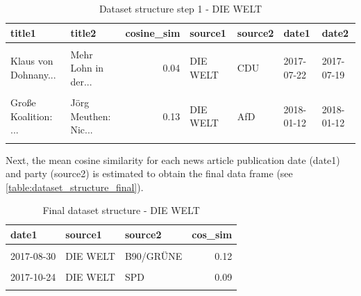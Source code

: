 \documentclass[
]{article}
\begin{document}
\begin{table}[H]

\caption{\label{tab:Dataset structure 1}Dataset structure step 1 - DIE WELT \label{table:dataset_structure1}}
\centering
\fontsize{7}{9}\selectfont
\begin{tabular}[t]{llrllll}
\toprule
title1 & title2 & cosine\_sim & source1 & source2 & date1 & date2\\
\midrule
\cellcolor{gray!6}{Muslime gegen Ter...} & \cellcolor{gray!6}{Musterfeststellun...} & \cellcolor{gray!6}{0.01} & \cellcolor{gray!6}{DIE WELT} & \cellcolor{gray!6}{SPD} & \cellcolor{gray!6}{2017-06-18} & \cellcolor{gray!6}{2017-06-17}\\
Klaus von Dohnany... & Mehr Lohn in der... & 0.04 & DIE WELT & CDU & 2017-07-22 & 2017-07-19\\
\cellcolor{gray!6}{Erststimme: Finde...} & \cellcolor{gray!6}{Ungarns Ignoranz...} & \cellcolor{gray!6}{0.01} & \cellcolor{gray!6}{DIE WELT} & \cellcolor{gray!6}{FDP} & \cellcolor{gray!6}{2017-09-11} & \cellcolor{gray!6}{2017-09-06}\\
Große Koalition: ... & Jörg Meuthen: Nic... & 0.13 & DIE WELT & AfD & 2018-01-12 & 2018-01-12\\
\cellcolor{gray!6}{Merkels verbale W...} & \cellcolor{gray!6}{Integration und S...} & \cellcolor{gray!6}{0.06} & \cellcolor{gray!6}{DIE WELT} & \cellcolor{gray!6}{DIE LINKE} & \cellcolor{gray!6}{2017-09-13} & \cellcolor{gray!6}{2017-09-08}\\
\bottomrule
\end{tabular}
\end{table}

Next, the mean cosine similarity for each news article publication date
(date1) and party (source2) is estimated to obtain the final data frame
(see \autoref{table:dataset_structure_final}).

\begin{table}[H]

\caption{\label{tab:Dataset structure final}Final dataset structure - DIE WELT \label{table:dataset_structure_final}}
\centering
\fontsize{7}{9}\selectfont
\begin{tabular}[t]{lllr}
\toprule
date1 & source1 & source2 & cos\_sim\\
\midrule
\cellcolor{gray!6}{2018-01-20} & \cellcolor{gray!6}{DIE WELT} & \cellcolor{gray!6}{DIE LINKE} & \cellcolor{gray!6}{0.15}\\
2017-08-30 & DIE WELT & B90/GRÜNE & 0.12\\
\cellcolor{gray!6}{2017-10-11} & \cellcolor{gray!6}{DIE WELT} & \cellcolor{gray!6}{FDP} & \cellcolor{gray!6}{0.16}\\
2017-10-24 & DIE WELT & SPD & 0.09\\
\cellcolor{gray!6}{2017-06-08} & \cellcolor{gray!6}{DIE WELT} & \cellcolor{gray!6}{CDU} & \cellcolor{gray!6}{0.15}\\
\bottomrule
\end{tabular}
\end{table}
\end{document}
